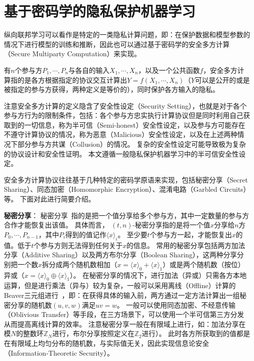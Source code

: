 \section{基于密码学的隐私保护机器学习}
纵向联邦学习可以看作是特定的一类隐私计算问题，即：在保护数据和模型参数的情况下进行模型的训练和推断，因此也可以通过基于密码学的安全多方计算（Secure Multiparty Computation）来实现。
%
\begin{definition}[安全多方计算]
    有$n$个参与方$P_1, \cdots, P_n$与各自的输入$X_1, \cdots, X_n$，以及一个公共函数$f$，安全多方计算指的是各方根据指定的协议交互计算出$Y= f(X_1, \cdots, X_n)$（$Y$可以是公开的或是被指定的参与方获得，两种定义是等价的），同时保护各方输入的隐私。
\end{definition}
%
注意安全多方计算的定义隐含了安全性设定（Security Setting），也就是对于各个参与方行为的限制条件，包括：各个参与方忠实执行计算协议但是同时利用自己获取到的一切信息，称为半可信（Semi-honest）安全性设定，以及参与方可能存在不遵守计算协议的情况，称为恶意（Malicious）安全性设定，以及在上述两种情况下部分参与方共谋（Collusion）的情况。
%
复杂的安全性设定可能导致极为复杂的协议设计和安全性证明。
%
本文遵循一般隐私保护机器学习中的半可信安全性设定。
%
%


安全多方计算协议往往基于几种特定的密码学原语来实现，包括秘密分享（Secret Sharing）、同态加密（Homomorphic Encryption）、混淆电路（Garbled Circuits）等。
%
下面对此进行简要介绍。
%


\textbf{秘密分享}：
秘密分享~\cite{shamir1979share}指的是把一个值分享给多个参与方，其中一定数量的参与方合作才能恢复出该值。
%
具体而言，
%
$(t,n)$-秘密分享指的是将一个值$x$分享给$n$方$P_0, \cdots, P_{n-1}$，其中$P_i$得到的值记作$\langle x \rangle_i$。
%
至少要$t$个参与方一起，才能恢复出$x$的值。低于$t$个参与方则无法得到任何关于$x$的信息。
%
常用的秘密分享包括两方加法分享（Additive Sharing）以及两方布尔分享（Boolean Sharing），这两种分享分别把一个数$x$拆分成两个随机数相加（$x = \langle x \rangle_0 + \langle x \rangle_1$）或是两个随机数（按位）异或（$x = \langle x \rangle_0 \oplus \langle x \rangle_1$）。
%
在秘密分享的情况下，进行加法（异或）只需各方本地运算，但是进行乘法（异与）较为复杂，一般可以采用离线（Offline）计算的Beaver三元组进行~\cite{beaver1992efficient}，即：在获得具体的输入前，两方通过一定方法计算出一组秘密分享的随机数$(u,v,w)$满足$uv = w$。
%
一般可以使用同态加密、不经意传输（Oblivious Transfer）等手段，在三方场景下，可以使用一个半可信第三方分发从而提高离线计算的效率。
%
注意秘密分享一般在有限域上进行，如：加法分享在模$N$的整数环$\mathbb Z_N$进行，布尔分享按照定义在$\mathbb Z_2$进行）。
%
此时各方所获取到的值都是在有限域上均匀分布的随机数，与实际值无关，因此实现信息论安全（Information-Theoretic Security）。


